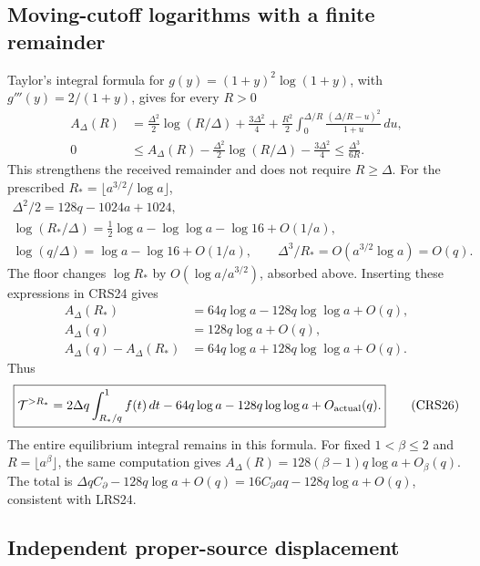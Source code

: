 \documentclass[11pt,a4paper]{article}
\begin{document}
\subsection{Moving-cutoff logarithms with a finite remainder}

Taylor's integral formula for $g(y)=(1+y)^2\log(1+y)$,
with $g'''(y)=2/(1+y)$, gives for every $R>0$
\[
\begin{split}
 A_\Delta(R)
 &=\tfrac{\Delta^2}{2}\log(R/\Delta)+\tfrac{3\Delta^2}{4}
  +\frac{R^2}{2}\int_0^{\Delta/R}
                         \frac{(\Delta/R-u)^2}{1+u}\,du,\\
 0&\le A_\Delta(R)-\tfrac{\Delta^2}{2}\log(R/\Delta)
                -\tfrac{3\Delta^2}{4}\le\frac{\Delta^3}{6R}.
\end{split}                                                    \tag{CRS24}
\]
This strengthens the received remainder and does not require $R\ge\Delta$.
For the prescribed $R_*=\lfloor a^{3/2}/\log a\rfloor$,
\[
\begin{gathered}
 \Delta^2/2=128q-1024a+1024,\\
 \log(R_*/\Delta)=\tfrac12\log a-\log\log a-\log16+O(1/a),\\
 \log(q/\Delta)=\log a-\log16+O(1/a),\qquad
 \Delta^3/R_*=O(a^{3/2}\log a)=O(q).
\end{gathered}
\]
The floor changes $\log R_*$ by $O(\log a/a^{3/2})$, absorbed
above. Inserting these expressions in CRS24 gives
\[
\begin{split}
 A_\Delta(R_*)&=64q\log a-128q\log\log a+O(q),\\
 A_\Delta(q)&=128q\log a+O(q),\\
 A_\Delta(q)-A_\Delta(R_*)&=64q\log a+128q\log\log a+O(q).
\end{split}                                                    \tag{CRS25}
\]
Thus
\[
 \boxed{\displaystyle
 \mathcal T^{>R_*}=2\Delta q\int_{R_*/q}^1 f(t)\,dt
   -64q\log a-128q\log\log a+O_{\rm actual}(q).}        \tag{CRS26}
\]
The entire equilibrium integral remains in this formula.
For fixed $1<\beta\le2$ and $R=\lfloor a^\beta\rfloor$,
the same computation gives
$A_\Delta(R)=128(\beta-1)q\log a+O_\beta(q)$.
The total is
$\Delta qC_\partial-128q\log a+O(q)
=16C_\partial aq-128q\log a+O(q)$, consistent with LRS24.

\subsection{Independent proper-source displacement}
\end{document}
